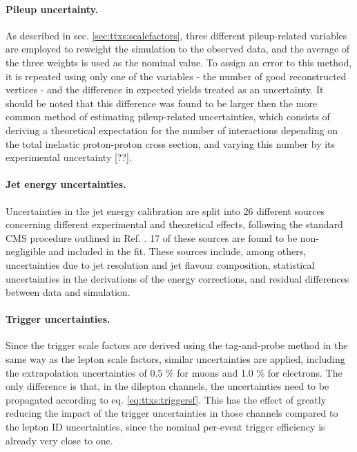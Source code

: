 \paragraph{Pileup uncertainty.}

As described in sec. \ref{sec:ttxs:scalefactors}, three different pileup-related variables are employed to reweight the simulation to the observed data, and the average of the three weights is used as the nominal value. To assign an error to this method, it is repeated using only one of the variables - the number of good reconstructed vertices - and the difference in expected yields treated as an uncertainty. It should be noted that this difference was found to be larger then the more common method of estimating pileup-related uncertainties, which consists of deriving a theoretical expectation for the number of interactions depending on the total inelastic proton-proton cross section, and varying this number by its experimental uncertainty [??].

\paragraph{Jet energy uncertainties.}

Uncertainties in the jet energy calibration are split into 26 different sources concerning different experimental and theoretical effects, following the standard CMS procedure outlined in Ref. \cite{CMS:JME-13-004}. 17 of these sources are found to be non-negligible and included in the fit. These sources include, among others, uncertainties due to jet \pt resolution and jet flavour composition, statistical uncertainties in the derivations of the energy corrections, and residual differences between data and simulation.

\paragraph{Trigger uncertainties.}

Since the trigger scale factors are derived using the tag-and-probe method in the same way as the lepton scale factors, similar uncertainties are applied, including the extrapolation uncertainties of 0.5 \% for muons and 1.0 \% for electrons. The only difference is that, in the dilepton channels, the uncertainties need to be propagated according to eq. \ref{eq:ttxs:triggersf}. This has the effect of greatly reducing the impact of the trigger uncertainties in those channels compared to the lepton ID uncertainties, since the nominal per-event trigger efficiency is already very close to one.


